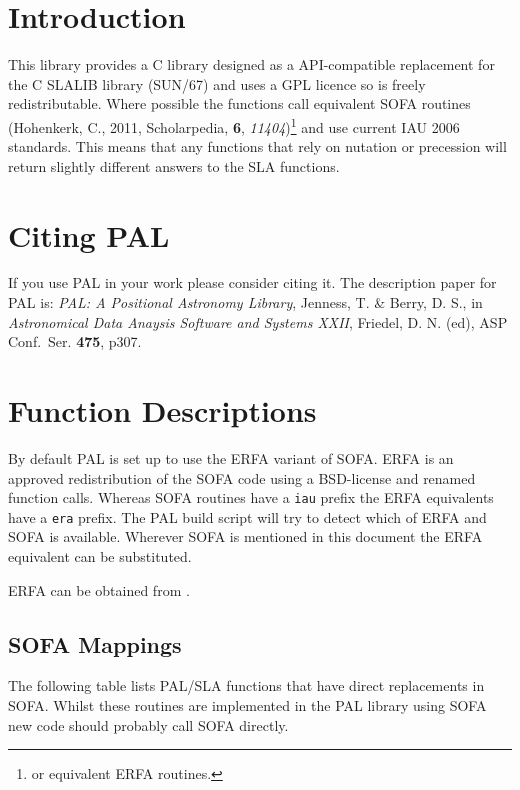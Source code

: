 \documentclass[twoside,11pt,nolof]{starlink}
\begin{document}
\scfrontmatter


\section{Introduction}

This library provides a C library designed as a API-compatible
replacement for the C SLALIB library (SUN/67) and uses a GPL licence so is
freely redistributable. Where possible the functions call equivalent
SOFA routines (Hohenkerk, C., 2011, Scholarpedia, \textbf{6}, \emph{11404})\footnote{or equivalent ERFA routines.}
and use current IAU 2006 standards. This means that any
functions that rely on nutation or precession will return slightly
different answers to the SLA functions.

\section{Citing PAL}

If you use PAL in your work please consider citing it. The description paper
for PAL is: \emph{PAL: A Positional Astronomy Library}, Jenness, T. \& Berry, D. S.,
in \emph{Astronomical Data Anaysis Software and Systems XXII}, Friedel, D. N. (ed),
ASP Conf.\ Ser. \textbf{475}, p307.

\clearpage
\appendix
\section{\label{APP:SPEC}Function Descriptions}

By default PAL is set up to use the ERFA variant of SOFA. ERFA is an
approved redistribution of the SOFA code using a BSD-license and
renamed function calls. Whereas SOFA routines have a \texttt{iau} prefix
the ERFA equivalents have a \texttt{era} prefix. The PAL build script
will try to detect which of ERFA and SOFA is available. Wherever SOFA
is mentioned in this document the ERFA equivalent can be substituted.

ERFA can be obtained from .

\subsection{SOFA Mappings}

The following table lists PAL/SLA functions that have direct
replacements in SOFA. Whilst these routines are implemented in the PAL
library using SOFA new code should probably call SOFA directly.
\end{document}
